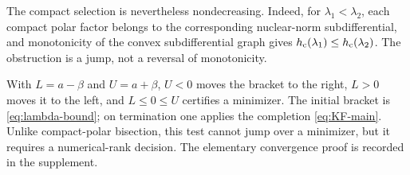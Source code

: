 The compact selection is nevertheless nondecreasing.  Indeed, for
\(\lambda_1<\lambda_2\), each compact polar factor belongs to the corresponding
nuclear-norm subdifferential, and monotonicity of the convex subdifferential
graph gives \(h_{\rm c}(\lambda_1)\le h_{\rm c}(\lambda_2)\).  The obstruction
is a jump, not a reversal of monotonicity.

\begin{remark}
With \(L=a-\beta\) and \(U=a+\beta\), \(U<0\) moves the bracket to the
right, \(L>0\) moves it to the left, and \(L\le0\le U\) certifies a
minimizer.  The initial bracket is \eqref{eq:lambda-bound}; on termination one
applies the completion \eqref{eq:KF-main}.  Unlike compact-polar bisection,
this test cannot jump over a minimizer, but it requires a numerical-rank
decision.  The elementary convergence proof is recorded in the supplement.
\end{remark}

